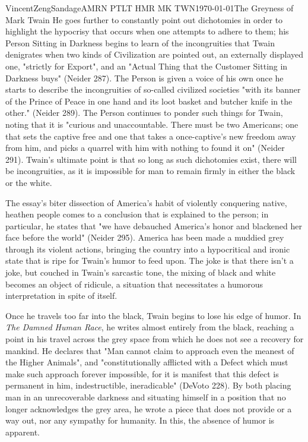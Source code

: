 \documentclass{article}[12pt]
\begin{document}
\begin{mla}{Vincent}{Zeng}{Sandage}{AMRN PTLT HMR MK TWN}{\today}{The Greyness of Mark Twain}
He goes further to constantly point out dichotomies in order to highlight the hypocrisy that occurs when one attempts to adhere to them; his Person Sitting in Darkness begins to learn of the incongruities that Twain denigrates when two kinds of Civilization are pointed out, an externally displayed one, "strictly for Export", and an "Actual Thing that the Customer Sitting in Darkness buys" (Neider 287). The Person is given a voice of his own once he starts to describe the incongruities of so-called civilized societies "with its banner of the Prince of Peace in one hand and its loot basket and butcher knife in the other." (Neider 289).  The Person continues to ponder such things for Twain, noting that it is "curious and unaccountable. There must be two Americans; one that sets the captive free and one that takes a once-captive's new freedom away from him, and picks a quarrel with him with nothing to found it on" (Neider 291). Twain's ultimate point is that so long as such dichotomies exist, there will be incongruities, as it is impossible for man to remain firmly in either the black or the white.

The essay's biter dissection of America's habit of violently conquering native, heathen people comes to a conclusion that is explained to the person; in particular, he states that "we have debauched America's honor and blackened her face before the world" (Neider 295). America has been made a muddied grey through its violent actions, bringing the country into a hypocritical and ironic state that is ripe for Twain's humor to feed upon. The joke is that there isn't a joke, but couched in Twain's sarcastic tone, the mixing of black and white becomes an object of ridicule, a situation that necessitates a humorous interpretation in spite of itself.

Once he travels too far into the black, Twain begins to lose his edge of humor. In \textit{The Damned Human Race}, he writes almost entirely from the black, reaching a point in his travel across the grey space from which he does not see a recovery for mankind. He declares that "Man cannot claim to approach even the meanest of the Higher Animals", and "constitutionally afflicted with a Defect which must make such approach forever impossible, for it is manifest that this defect is permanent in him, indestructible, ineradicable" (DeVoto 228). By both placing man in an unrecoverable darkness and situating himself in a position that no longer acknowledges the grey area, he wrote a piece that does not provide or a way out, nor any sympathy for humanity. In this, the absence of humor is apparent.


\end{mla}
\end{document}
